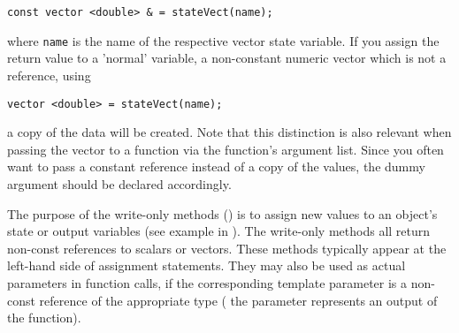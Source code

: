 \medskip
\begin{footnotesize}
  \verb!const vector <double> & = stateVect(name);!
\end{footnotesize}
\medskip

where \verb!name! is the name of the respective vector state variable. If you assign the return value to a 'normal' variable, \ie{} a non-constant numeric vector which is not a reference, using

\medskip
\begin{footnotesize}
  \verb!vector <double> = stateVect(name);!
\end{footnotesize}
\medskip

a copy of the data will be created. Note that this distinction is also relevant when passing the vector to a function via the function's argument list. Since you often want to pass a constant reference instead of a copy of the values, the dummy argument should be declared accordingly.

The purpose of the write-only methods () is to assign new values to an object's state or output variables (see example in ). The write-only methods all return non-const references to scalars or vectors. These methods typically appear at the left-hand side of assignment statements. They may also be used as actual parameters in function calls, if the corresponding template parameter is a non-const reference of the appropriate type (\ie{} the parameter represents an output of the function).

